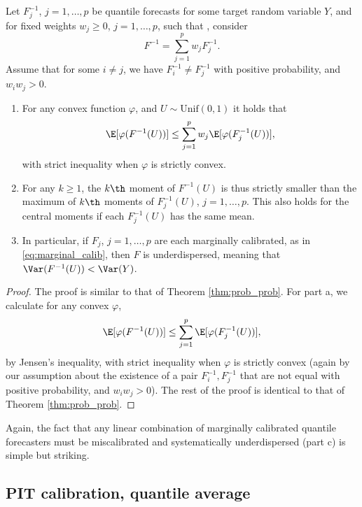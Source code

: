 \documentclass{article}
\begin{document}
\begin{theorem}
\label{thm:marginal_quant}
Let $F_j^{-1}$, $j=1,\dots,p$ be quantile forecasts for some target random
variable $Y$, and for fixed weights $w_j \geq 0$, $j=1,\dots,p$, such that
, consider   
\[
F^{-1} = \sum_{j=1}^p w_j F_j^{-1}.
\]
Assume that for some $i \not= j$, we have $F_i^{-1} \not= F_j^{-1}$ with
positive probability, and $w_iw_j > 0$. 

\begin{enumerate}[label=\alph*.]
\item For any convex function $\varphi$, and $U \sim \mathrm{Unif}(0,1)$ it
  holds that 
\[
\E[\varphi(F^{-1}(U))] \leq \sum_{j=1}^p w_j \E[\varphi(F_j^{-1}(U))], 
\]
with strict inequality when $\varphi$ is strictly convex.

\item For any $k \geq 1$, the $k\th$ moment of $F^{-1}(U)$ is thus strictly
  smaller than the maximum of $k\th$ moments of $F_j^{-1}(U)$,
  $j=1,\dots,p$. This also holds for the central moments if each $F_j^{-1}(U)$
  has the same mean. 

\item In particular, if $F_j$, $j=1,\dots,p$ are each marginally calibrated, as
  in \eqref{eq:marginal_calib}, then $F$ is underdispersed, meaning 
  that $\Var(F^{-1}(U)) < \Var(Y)$.
\end{enumerate}
\end{theorem}

\begin{proof}
The proof is similar to that of Theorem \ref{thm:prob_prob}. For part a, we
calculate for any convex $\varphi$,   
\[
\E[\varphi(F^{-1}(U))] \leq \sum_{j=1}^p \E[\varphi(F_j^{-1}(U))],
\]
by Jensen's inequality, with strict inequality when $\varphi$ is strictly 
convex (again by our assumption about the existence of a pair
$F_i^{-1},F_j^{-1}$ that are not equal with positive probability, and
$w_iw_j>0$). The rest of the proof is identical to that of Theorem
\ref{thm:prob_prob}.  
\end{proof}

Again, the fact that any linear combination of marginally calibrated quantile
forecasters must be miscalibrated and systematically underdispersed (part c) is
simple but striking.

\subsection{PIT calibration, quantile average}
\end{document}
